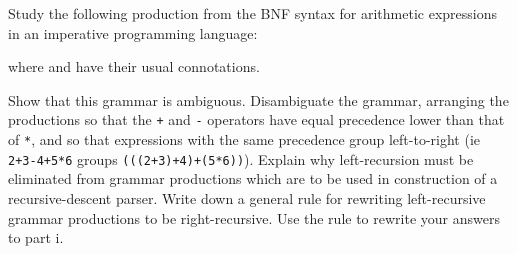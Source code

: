 \begin{questions}
\begin{subquestions}
\vspace{0.1in}

\subquestion
Study the following production from the BNF syntax for 
arithmetic expressions in an imperative programming language:
\begin{bnf}
\end{bnf}
where  and  have their usual connotations.
\begin{subsubquestions}
\subsubquestion
Show that this grammar is ambiguous. Disambiguate the grammar,
arranging the productions so that 
the \verb"+" and \verb"-" operators
have equal precedence lower than that of \verb"*",
and so that expressions with the same precedence group 
left-to-right (ie \verb"2+3-4+5*6" groups \verb"(((2+3)+4)+(5*6))").
\subsubquestion
        Explain why left-recursion must be eliminated from
        grammar productions which are to be used in
        construction of a recursive-descent parser.
        Write down a general rule for rewriting left-recursive
        grammar productions to be right-recursive. Use the rule
	to rewrite your answers to part i.
\end{subsubquestions}

\end{subquestions}

\newpage

\question



\end{questions}
